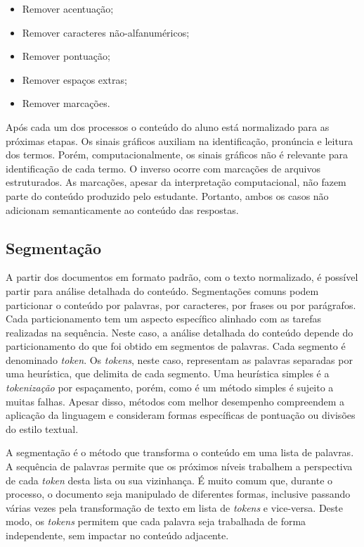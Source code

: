 \begin{itemize}
	\item Remover acentuação;
	\item Remover caracteres não-alfanuméricos;
	\item Remover pontuação;
	\item Remover espaços extras;
	\item Remover marcações.
\end{itemize}

Após cada um dos processos o conteúdo do aluno está normalizado para as próximas etapas. Os sinais gráficos auxiliam na identificação, pronúncia e leitura dos termos. Porém, computacionalmente, os sinais gráficos não é relevante para identificação de cada termo. O inverso ocorre com marcações de arquivos estruturados. As marcações, apesar da interpretação computacional, não fazem parte do conteúdo produzido pelo estudante. Portanto, ambos os casos não adicionam semanticamente ao conteúdo das respostas.

\subsection{Segmentação}

A partir dos documentos em formato padrão, com o texto normalizado, é possível partir para análise detalhada do conteúdo. Segmentações comuns podem particionar o conteúdo por palavras, por caracteres, por frases ou por parágrafos. Cada particionamento tem um aspecto específico alinhado com as tarefas realizadas na sequência. Neste caso, a análise detalhada do conteúdo depende do particionamento do que foi obtido em segmentos de palavras. Cada segmento é denominado \textit{token}. Os \textit{tokens}, neste caso, representam as palavras separadas por uma heurística, que delimita de cada segmento. Uma heurística simples é a \textit{tokenização} por espaçamento, porém, como é um método simples é sujeito a muitas falhas. Apesar disso, métodos com melhor desempenho compreendem a aplicação da linguagem e consideram formas específicas de pontuação ou divisões do estilo textual.

A segmentação é o método que transforma o conteúdo em uma lista de palavras. A sequência de palavras permite que os próximos níveis trabalhem a perspectiva de cada \textit{token} desta lista ou sua vizinhança. É muito comum que, durante o processo, o documento seja manipulado de diferentes formas, inclusive passando várias vezes pela transformação de texto em lista de \textit{tokens} e vice-versa. Deste modo, os \textit{tokens} permitem que cada palavra seja trabalhada de forma independente, sem impactar no conteúdo adjacente.

